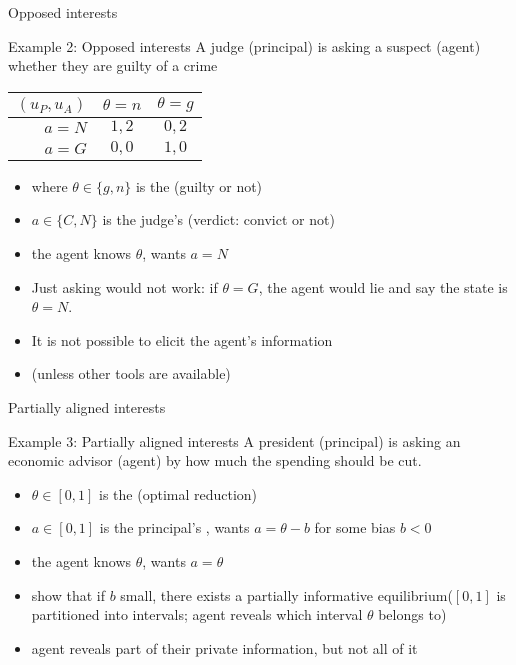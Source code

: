 \documentclass[english,10pt
,aspectratio=169
]{beamer}
\begin{document}
\begin{frame}{Opposed interests}
	\begin{exampleblock}{Example 2: Opposed interests}
		A judge (principal) is asking a suspect (agent) whether they are guilty of a crime
		\begin{center}
			\begin{tabular}{r | c | c |}
				$(u_P,u_A)$	& $\theta=n$	& $\theta=g$
				\\ \hline 
				$a=N$ 		& $1,2$			& $0,2$
				\\ \hline
				$a=G$		& $0,0$			& $1,0$
				\\ \hline 
			\end{tabular}
		\end{center}
	\end{exampleblock}
	
	\begin{itemize}
		\item where $\theta\in \{g,n\}$ is the  (guilty or not)
		\item $a \in \{C,N\}$ is the judge's  (verdict: convict or not)
		\item the agent knows $\theta$, wants $a=N$
		\pause \bigskip 
		\item Just asking would not work: if $\theta=G$, \alert<2>{the agent would lie} and say the state is $\theta=N$.
		\item It is \alert<2>{not possible} to elicit the agent's information
		\item (unless other tools are available)
	\end{itemize}
\end{frame}


\begin{frame}{Partially aligned interests}
	\begin{exampleblock}{Example 3: Partially aligned interests}
		A president (principal) is asking an economic advisor (agent) by how much the spending should be cut.
	\end{exampleblock}
	
	\begin{itemize}
		\item $\theta\in [0,1]$ is the  (optimal reduction)
		\item $a \in [0,1]$ is the principal's , wants $a=\theta-b$ for some bias $b<0$
		\item the agent knows $\theta$, wants $a=\theta$
		\pause \bigskip 
		\item \cite{crawford_strategic_1982} show that if $b$ small, there exists a \alert<2>{partially informative} equilibrium($[0,1]$ is partitioned into intervals; agent reveals which interval $\theta$ belongs to)
		\item agent \alert{reveals part} of their private information, but not all of it
	\end{itemize}
\end{frame}
\end{document}
